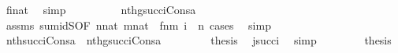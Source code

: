\begin{isabellebody}
\ {\isacartoucheopen}f{\isacharbackquote}{\kern0pt}i{\isasymin}nat{\isacartoucheclose}\ \isamarkupfalse%
\ simp\isanewline
\ \ \ \ \isamarkupfalse%
\ \isamarkupfalse%
\ {\isachardoublequoteopen}{\isachardot}{\kern0pt}{\isachardot}{\kern0pt}{\isachardot}{\kern0pt}\ {\isacharequal}{\kern0pt}\ nth{\isacharparenleft}{\kern0pt}{\isacharquery}{\kern0pt}g{\isacharbackquote}{\kern0pt}succ{\isacharparenleft}{\kern0pt}i{\isacharparenright}{\kern0pt}{\isacharcomma}{\kern0pt}Cons{\isacharparenleft}{\kern0pt}a{\isacharcomma}{\kern0pt}{\isasymrho}{\isacharprime}{\kern0pt}{\isacharparenright}{\kern0pt}{\isacharparenright}{\kern0pt}{\isachardoublequoteclose}\isanewline
\ \ \ \ \ \ \isamarkupfalse%
\ assms\ sum{\isacharunderscore}{\kern0pt}idS{\isacharbrackleft}{\kern0pt}OF\ {\isacartoucheopen}n{\isasymin}nat{\isacartoucheclose}\ {\isacartoucheopen}m{\isasymin}nat{\isacartoucheclose}\ \ {\isacartoucheopen}f{\isasymin}n{\isasymrightarrow}m{\isacartoucheclose}\ {\isacartoucheopen}i\ {\isasymin}\ n{\isacartoucheclose}{\isacharbrackright}{\kern0pt}\ cases\ \isamarkupfalse%
\ simp\isanewline
\ \ \ \ \isamarkupfalse%
\ \isamarkupfalse%
\ {\isachardoublequoteopen}nth{\isacharparenleft}{\kern0pt}succ{\isacharparenleft}{\kern0pt}i{\isacharparenright}{\kern0pt}{\isacharcomma}{\kern0pt}Cons{\isacharparenleft}{\kern0pt}a{\isacharcomma}{\kern0pt}{\isasymrho}{\isacharparenright}{\kern0pt}{\isacharparenright}{\kern0pt}\ {\isacharequal}{\kern0pt}\ nth{\isacharparenleft}{\kern0pt}{\isacharquery}{\kern0pt}g{\isacharbackquote}{\kern0pt}succ{\isacharparenleft}{\kern0pt}i{\isacharparenright}{\kern0pt}{\isacharcomma}{\kern0pt}Cons{\isacharparenleft}{\kern0pt}a{\isacharcomma}{\kern0pt}{\isasymrho}{\isacharprime}{\kern0pt}{\isacharparenright}{\kern0pt}{\isacharparenright}{\kern0pt}{\isachardoublequoteclose}\ \isacommand{{\isachardot}{\kern0pt}}\isamarkupfalse%
\isanewline
\ \ \ \ \isamarkupfalse%
\ \isamarkupfalse%
\ {\isacharquery}{\kern0pt}thesis\ \isamarkupfalse%
\ {\isacartoucheopen}j{\isacharequal}{\kern0pt}succ{\isacharparenleft}{\kern0pt}i{\isacharparenright}{\kern0pt}{\isacartoucheclose}\ \isamarkupfalse%
\ simp\isanewline
\ \ \isamarkupfalse%
\isanewline
\ \ \isamarkupfalse%
\ \isamarkupfalse%
\ {\isacharquery}{\kern0pt}thesis\ \isacommand{{\isachardot}{\kern0pt}}\isamarkupfalse%
\isanewline
{}\isamarkupfalse%
%
\endisatagproof
{\isafoldproof}%

\end{isabellebody}
